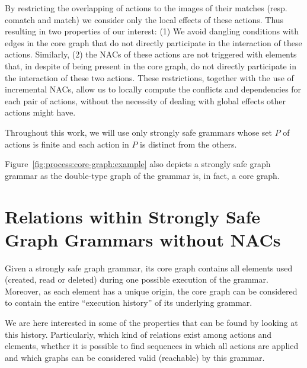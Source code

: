  By restricting the overlapping of actions to the images of their matches (resp. comatch and match) we consider only the local effects of these actions. Thus resulting in two properties of our interest: (1) We avoid dangling conditions with edges in the core graph that do not directly participate in the interaction of these actions. Similarly, (2) the NACs of these actions are not triggered with elements that, in despite of being present in the core graph, do not directly participate in the interaction of these two actions. These restrictions, together with the use of incremental NACs, allow us to locally compute the conflicts and dependencies for each pair of actions, without the necessity of dealing with global effects other actions might have.



\begin{remark} Throughout this work, we will use only strongly safe grammars whose set $P$ of actions is finite and each action in $P$ is distinct from the others.

\hfill
\end{remark}

\begin{example} Figure~\ref{fig:process:core-graph:example} also depicts a strongly safe graph grammar as the double-type graph of the grammar is, in fact, a core graph.
\end{example}

\section{Relations within Strongly Safe Graph Grammars without NACs}

Given a strongly safe graph grammar, its core graph contains all elements used (created, read or deleted) during one possible execution of the grammar. Moreover, as each element has a unique origin, the core graph can be considered to contain the entire ``execution history'' of its underlying grammar.

We are here interested in some of the properties that can be found by looking at this history. Particularly, which kind of relations exist among actions and elements, whether it is possible to find sequences in which all actions are applied and which graphs can be considered valid (reachable) by this grammar.

